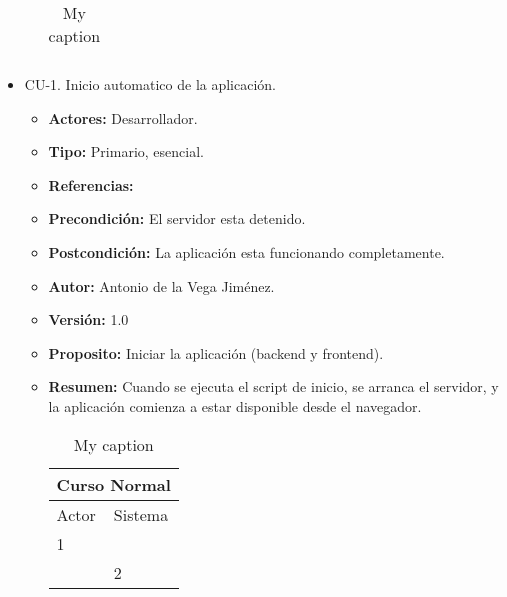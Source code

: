 \begin{itemize}
\begin{itemize}
\begin{table}[H]
\begin{tabularx}{\textwidth}{|X|X|}
      \end{tabularx}
      \caption{My caption}
      \label{my-label}
    \end{table}
  \end{itemize}
  \item CU-1. Inicio automatico de la aplicación.
  \begin{itemize}
    \item \textbf{Actores:} Desarrollador.
    \item \textbf{Tipo:} Primario, esencial.
    \item \textbf{Referencias:}
    \item \textbf{Precondición:} El servidor esta detenido.
    \item \textbf{Postcondición:} La aplicación esta funcionando completamente.
    \item \textbf{Autor:} Antonio de la Vega Jiménez.
    \item \textbf{Versión:} 1.0
    \item \textbf{Proposito:} Iniciar la aplicación (backend y frontend).
    \item \textbf{Resumen:} Cuando se ejecuta el script de inicio, se arranca el servidor, y la aplicación comienza a estar disponible desde el navegador.
    \begin{table}[H]
      \centering
      \begin{tabularx}{\textwidth}{|X|X|X|X|}
        \hline
        \multicolumn{4}{|c|}{\cellcolor[HTML]{C0C0C0}Curso Normal}                                                 \\ \hline
        \multicolumn{2}{|l|}{\cellcolor[HTML]{EFEFEF}Actor} & \multicolumn{2}{l|}{\cellcolor[HTML]{EFEFEF}Sistema} \\ \hline
        1                         &                         &                            &                         \\ \hline
                                  &                         & 2                          &                         \\ \hline
      \end{tabularx}
      \caption{My caption}
      \label{my-label}
    \end{table}
    \begin{table}[H]

\end{table}
\end{itemize}
\end{itemize}

